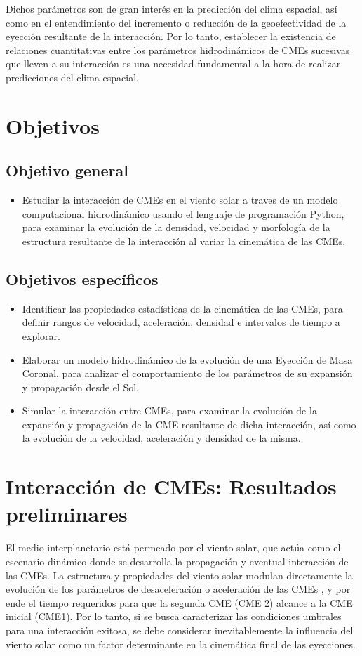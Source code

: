Dichos parámetros son de gran interés en la predicción del clima espacial, así como en el entendimiento del incremento o reducción de la geoefectividad de la eyección resultante de la interacción. Por lo tanto, establecer la existencia de relaciones cuantitativas entre los parámetros hidrodinámicos de CMEs sucesivas que lleven a su interacción es una necesidad fundamental a la hora de realizar predicciones del clima espacial. 
\section{Objetivos}

\subsection{Objetivo general}
\begin{itemize}
\item Estudiar la interacción de CMEs en el viento solar a traves de un modelo computacional hidrodinámico usando el lenguaje de programación Python, para examinar la evolución de la densidad, velocidad y morfología de la estructura resultante de la interacción al variar la cinemática de las CMEs.
\end{itemize}
\subsection{Objetivos específicos}
\begin{itemize}
\item Identificar las propiedades estadísticas de la cinemática de las CMEs, para definir rangos de velocidad, aceleración, densidad e intervalos de tiempo a explorar.
\item Elaborar un modelo hidrodinámico de la evolución de una Eyección de Masa Coronal, para analizar el comportamiento de los parámetros de su expansión y propagación desde el Sol.
\item Simular la interacción entre CMEs, para examinar la evolución de la expansión y propagación de la CME resultante de dicha interacción, así como la evolución de la velocidad, aceleración y densidad de la misma.
\end{itemize}

\section{Interacción de CMEs: Resultados preliminares}
El medio interplanetario está permeado por el viento solar, que actúa como el escenario dinámico donde se desarrolla la propagación y eventual interacción de las CMEs. La estructura y propiedades del viento solar modulan directamente la evolución de los parámetros de desaceleración o aceleración de las CMEs \parencite[e.g.][]{mayank-2023}, y por ende el tiempo requeridos para que la segunda CME (CME 2) alcance a la CME inicial (CME1). Por lo tanto, si se busca caracterizar las condiciones umbrales para una interacción exitosa, se debe considerar inevitablemente la influencia del viento solar como un factor determinante en la cinemática final de las eyecciones.

